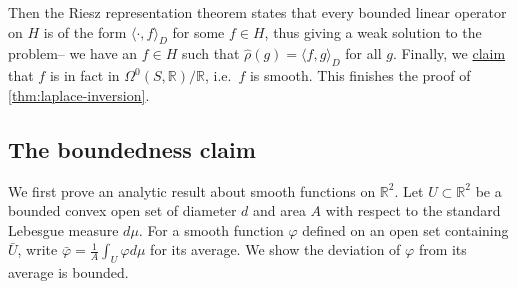 Then the Riesz representation theorem states that every bounded linear operator
on \(H\) is of the form \(\langle \cdot, f\rangle_D\) for some \(f\in H\), thus
giving a weak solution to the problem-- we have an \(f\in H\) such that
\(\hat\rho(g)=\langle f, g\rangle_D\) for all \(g\). Finally, we
\underline{claim} that \(f\) is in fact in
\(\Omega^0(S,\mathbb{R})/\mathbb{R}\), i.e.\ \(f\) is smooth. This finishes the
proof of \cref{thm:laplace-inversion}.

\subsection{The boundedness claim} We first prove an analytic result about
smooth functions on \(\mathbb{R}^2\). Let \(U\subset \mathbb{R}^2\) be a bounded
convex open set of diameter \(d\) and area \(A\) with respect to the standard
Lebesgue measure \(d\mu\). For a smooth function \(\varphi\) defined on an open
set containing \(\bar U\), write \(\bar\varphi = \frac{1}{A} \int_U \varphi
d\mu\) for its average. We show the deviation of \(\varphi\) from its average is
bounded.

